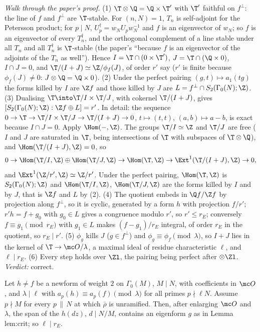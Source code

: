 \begin{sloppypar}
\emph{Walk through the paper's proof.} (1) $\T\otimes\Q=\Q\times\T'$ with $\T'$ faithful on $f^\perp$: the line of $f$ and $f^\perp$ are $\T$-stable. For $(n,N)=1$, $T_n$ is self-adjoint
for the Petersson product; for $p\mid N$, $U_p^\dagger=w_NU_pw_N^{-1}$ and $f$ is an eigenvector of $w_N$; so $f$ is an eigenvector of every $T_n^\dagger$, and the orthogonal
complement of a line stable under all $T_n$ and all $T_n^\dagger$ is $\T$-stable (the paper's ``because $f$ is an eigenvector of the adjoints of the $T_n$ as well''). Hence
$I=\T\cap(0\times\T')$, $J=\T\cap(\Q\times0)$, $I\cap J=0$, and $\T/(I+J)\simeq\Z/\phi_f(J)$, of order $r'$ say ($r'$ is finite because $\phi_f(J)\ne0$: $J\otimes\Q=\Q\times0$). (2) Under the perfect
pairing $(g,t)\mapsto a_1(tg)$ the forms killed by $I$ are $\Z f$ and those killed by $J$ are $L=f^\perp\cap S_2(\Gamma_0(N);\Z)$. (3) Dualising $\T\into\T/I\times\T/J$, with cokernel
$\T/(I+J)$, gives $[S_2(\Gamma_0(N);\Z):\Z f\oplus L]=r'$. In detail: the sequence $0\to\T\to\T/I\times\T/J\to\T/(I+J)\to0$, $t\mapsto(t,t)$, $(a,b)\mapsto a-b$, is exact because $I\cap J=0$.
Apply $\Hom(-,\Z)$. The groups $\T/I\simeq\Z$ and $\T/J$ are free ($I$ and $J$ are saturated in $\T$, being intersections of $\T$ with subspaces of $\T\otimes\Q$), and $\Hom(\T/(I+J),\Z)=0$, so
\[
0\to\Hom(\T/I,\Z)\oplus\Hom(\T/J,\Z)\to\Hom(\T,\Z)\to\Ext^1(\T/(I+J),\Z)\to0,
\]
and $\Ext^1(\Z/r',\Z)\simeq\Z/r'$. Under the perfect pairing, $\Hom(\T,\Z)$ is $S_2(\Gamma_0(N);\Z)$ and $\Hom(\T/I,\Z)$, $\Hom(\T/J,\Z)$ are the forms killed by $I$ and by $J$, that is $\Z f$ and $L$ by (2). (4) The quotient embeds in $\Q f/\Z f$ by projection along $f^\perp$, so it is cyclic, generated by a form $h$ with projection
$f/r'$; $r'h=f+g_0$ with $g_0\in L$ gives a congruence modulo $r'$, so $r'\le r_E$; conversely $f\equiv g_1\pmod{r_E}$ with $g_1\in L$ makes $(f-g_1)/r_E$ integral, of order $r_E$ in the
quotient, so $r_E\mid r'$. (5) $\phi_g$ kills $J$ ($g\in f^\perp$) and $\phi_g\equiv\phi_f\pmod\lambda$, so $I+J$ lies in the kernel of $\T\to\mc O/\lambda$, a maximal ideal of residue characteristic
$\ell$, and $\ell\mid r_E$. (6) Every step holds over $\Zl$, the pairing being perfect after $\otimes\Zl$. \emph{Verdict:} correct.

\begin{lemma}\label{lem:paper:old}
Let $h\ne f$ be a newform of weight $2$ on $\Gamma_0(M)$, $M\mid N$, with coefficients in $\mc O$, and $\lambda\mid\ell$ with $a_p(h)\equiv a_p(f)\pmod\lambda$ for all primes $p\nmid\ell N$. Assume $p\nmid M$
for every $p\,\|\,N$ at which $\bar\rho$ is unramified. Then, after enlarging $\mc O$ and $\lambda$, the span of the $h(dz)$, $d\mid N/M$, contains an eigenform $g$ as in Lemma lem:crit; so
$\ell\mid r_E$.
\end{lemma}


\end{sloppypar}
